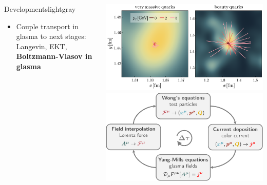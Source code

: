 \documentclass[aspectratio=169,11pt,usenames,dvipsnames]{beamer}
\begin{document}
\begin{frame}
\begin{center}
\begin{columns}
\begin{center}
\begin{custombox2}{{\color{jyured}Developments}}{lightgray}
\begin{varwidth}{\textwidth}
\begin{itemize}
                        \item Couple transport in glasma to next stages: Langevin, EKT, {\bfseries\color{jyured} Boltzmann-Vlasov in glasma}
                    \end{itemize}
                    \end{varwidth}
                \end{custombox2}
            \end{center}
                \vspace{10pt}
                \begin{center}\includegraphics[width=\columnwidth]{images/hqs_flux_tubes.png}\\[5pt]
                    \includegraphics[width=\columnwidth]{images/cpic.pdf}\end{center}
        \end{columns}
    \end{center}
\end{frame}
\end{document}
